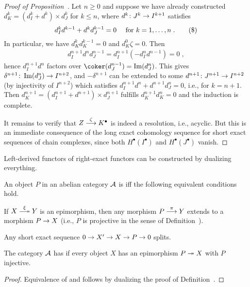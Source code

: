 \documentclass[a4paper,parskip=half,numbers=enddot, DIV=12]{scrreprt}
\begin{document}
\begin{proof}[Proof of Proposition~]
	 Let $n\geq 0$ and suppose we have already constructed $d_{K }^k=(d_{I }^k+d^k)\times d_{J }^k$ for $k\leq n$, where $d^k\colon J^k\morphism I^{k+1}$ satisfies
	 \begin{align}\lbl{eq:Horseshoe3}
	 	 d_{I }^kd^{k-1}+d^kd_{J }^{k-1}=0\quad\text{ for }k=1,\ldots,n\;.\tag{\$}
	 \end{align}
	  In particular, we have $d_{K }^kd_{K }^{k-1}=0$ and $d_{K }^0\zeta=0$. Then
	 \begin{align*}
	 	d_{I }^{n+1}d^nd_{J }^{n-1}=d_{I }^{n+1}\left(-d_{I }^nd^{n-1}\right)=0\;,
	 \end{align*}
	 hence $d_{I }^{n+1}d^n$ factors over $\coker(d_{J }^{n-1})=\Im(d_{J }^n)$. This gives $\delta^{n+1}\colon \Im(d_{J }^n)\morphism I^{n+2}$, and $-\delta^{n+1}$ can be extended to some $d^{n+1}\colon J^{n+1}\morphism I^{n+2}$ (by injectivity of $I^{n+2}$) which satisfies $d_{I }^{n+1}d^{n}+d^{n+1}d_{J }^n=0$, i.e.,  for $k=n+1$. Then $d_{K }^{n+1}=(d_{I }^{n+1}+d^{n+1})\times d_{J }^{n+1}$ fulfills $d_{K }^{n+1}d_{K }^n=0$ and the induction is complete.
	
	 It remains to verify that $Z\morphism[\zeta]K^\bullet $ is indeed a resolution, i.e., acyclic. But this is an immediate consequence of the long exact cohomology sequence for short exact sequences of chain complexes, since both $H^\bullet (I^\bullet )$ and $H^\bullet (J^\bullet )$ vanish.
\end{proof}
Left-derived functors of right-exact functors can be constructed by dualizing everything.
\begin{defi}
	An object $P$ in an abelian category $\mathcal{A}$ is  iff the following equivalent conditions hold.
	\begin{alphanumerate}
		\item If $X\epimorphism[\xi] Y$ is an epimorphism, then any morphism $P\morphism[\pi] Y$ extends to a morphism $P\morphism X$ (i.e., $P$ is projective in the sense of Definition~).
		\item Any short exact sequence $0\morphism X'\morphism X\morphism P\morphism 0$ splits.
	\end{alphanumerate}
	The category $\mathcal{A}$ has  if every object $X$ has an epimorphism $P\epimorphism X$ with $P$ injective.
\end{defi}
\begin{proof}
	Equivalence of  and  follows by dualizing the proof of Definition~.
\end{proof}
\end{document}
